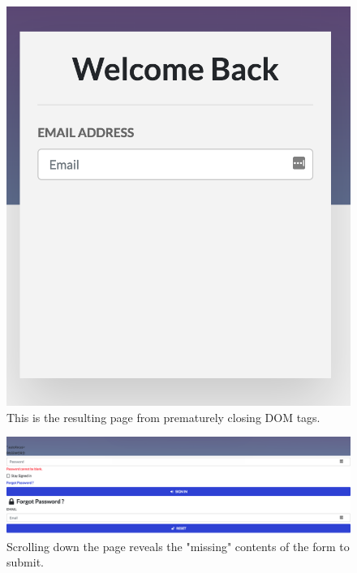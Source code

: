 \begin{figure}[h!]
	\centering
	\includegraphics[width=0.6\linewidth]{images/test_case_1/attack_form_1.png}
	\caption{This is the resulting page from prematurely closing DOM tags. }
	\label{fig:attack_form_1}	
\end{figure} 


\begin{figure}[h!]
	\centering
	\includegraphics[width=\linewidth]{images/test_case_1/scroll_attack_1.png}
	\caption{Scrolling down the page reveals the "missing" contents of the form to submit.}
	\label{fig:scroll_attack_1}	
\end{figure} 

